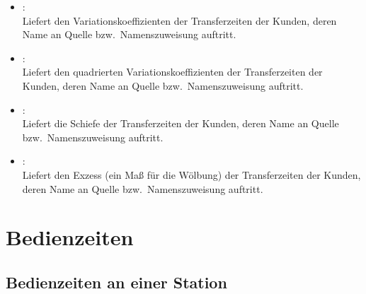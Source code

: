 \begin{itemize}
\item
{}:\\
Liefert den Variationskoeffizienten der Transferzeiten der Kunden, deren Name an Quelle bzw.\ Namenszuweisung  auftritt.

\item
{}:\\
Liefert den quadrierten Variationskoeffizienten der Transferzeiten der Kunden, deren Name an Quelle bzw.\ Namenszuweisung  auftritt.

\item
{}:\\
Liefert die Schiefe der Transferzeiten der Kunden, deren Name an Quelle bzw.\ Namenszuweisung  auftritt.

\item
{}:\\
Liefert den Exzess (ein Maß für die Wölbung) der Transferzeiten der Kunden, deren Name an Quelle bzw.\ Namenszuweisung  auftritt.

\end{itemize}



\section{Bedienzeiten}



\subsection{Bedienzeiten an einer Station}


